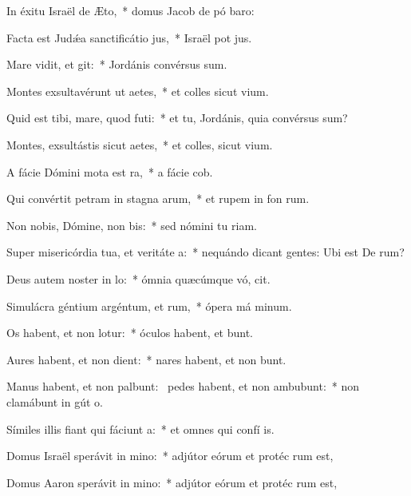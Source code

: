 \item In éxitu Israël de Æto,~* domus Jacob de pó baro:
\item Facta est Judǽa sanctificátio jus,~* Israël pot jus.
\item Mare vidit, et git:~* Jordánis convérsus  sum.
\item Montes exsultavérunt ut aetes,~* et colles sicut  vium.
\item Quid est tibi, mare, quod futi:~* et tu, Jordánis, quia convérsus  sum?
\item Montes, exsultástis sicut aetes,~* et colles, sicut  vium.
\item A fácie Dómini mota est ra,~* a fácie  cob.
\item Qui convértit petram in stagna arum,~* et rupem in fon rum.
\item Non nobis, Dómine, non bis:~* sed nómini tu  riam.
\item Super misericórdia tua, et veritáte a:~* nequándo dicant gentes: Ubi est De rum?
\item Deus autem noster in lo:~* ómnia quæcúmque vó, cit.
\item Simulácra géntium argéntum, et rum,~* ópera má minum.
\item Os habent, et non lotur:~* óculos habent, et  bunt.
\item Aures habent, et non dient:~* nares habent, et non bunt.
\item Manus habent, et non palbunt:~\pscross{} pedes habent, et non ambubunt:~* non clamábunt in gút o.
\item Símiles illis fiant qui fáciunt a:~* et omnes qui confí  is.
\item Domus Israël sperávit in mino:~* adjútor eórum et protéc rum est,
\item Domus Aaron sperávit in mino:~* adjútor eórum et protéc rum est,
